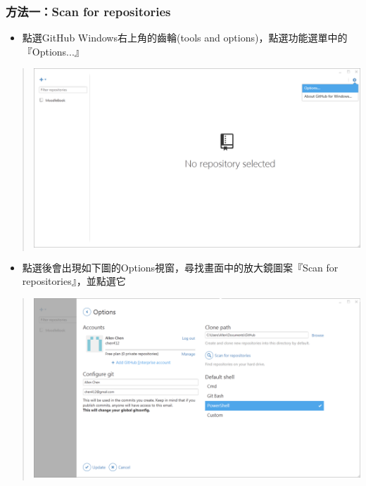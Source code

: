 \documentclass[letterpaper,10pt,english]{sphinxmanual}
\begin{document}
\subsubsection{方法一：Scan for repositories}
\label{_doc/writing/index-github:scan-for-repositories}\begin{itemize}
\item {} 
點選GitHub Windows右上角的齒輪(tools and options)，點選功能選單中的『Options...』

\end{itemize}
\begin{quote}

\includegraphics{GitHub-Option-001.png}
\end{quote}
\begin{itemize}
\item {} 
點選後會出現如下圖的Options視窗，尋找畫面中的放大鏡圖案『Scan for repositories』，並點選它

\end{itemize}
\begin{quote}

\includegraphics{GitHub-Option-002.png}
\end{quote}
\end{document}
